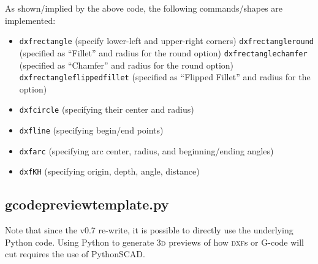 \documentclass{ltxdoc}
\begin{document}
As shown/implied by the above code, the following commands/shapes are implemented:

\begin{itemize}
\item \verb|dxfrectangle| (specify lower-left and upper-right corners)
\subitem\verb|dxfrectangleround| (specified as ``Fillet'' and radius for the round option)
\subitem\verb|dxfrectanglechamfer| (specified as ``Chamfer'' and radius for the round option)
\subitem\verb|dxfrectangleflippedfillet| (specified as ``Flipped Fillet'' and radius for the option)
\item \verb|dxfcircle| (specifying their center and radius)
\item \verb|dxfline| (specifying begin/end points)
\item \verb|dxfarc| (specifying arc center, radius, and beginning/ending angles)
\item \verb|dxfKH| (specifying origin, depth, angle, distance)
 \end{itemize}


\subsection{gcodepreviewtemplate.py}
           
Note that since the v0.7 re-write, it is possible to directly use the underlying Python code. Using Python to generate \textsc{3d} previews of how \textsc{dxf}s or G-code will cut requires the use of PythonSCAD.
\end{document}
